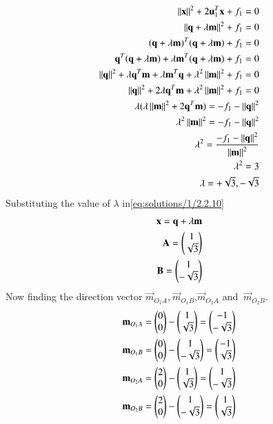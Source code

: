   \begin{align}
 \left\lVert\mathbf{x}\right\rVert^2 + 2\mathbf{u}_1^T\mathbf{x} + f_1 = 0\\
 \left\lVert\mathbf{q}+\lambda\mathbf{m}\right\rVert^2 + f_1 = 0\\
 (\mathbf{q}+\lambda \mathbf{m})^T(\mathbf{q}+\lambda \mathbf{m})+f_1=0\\
 \mathbf{q}^T(\mathbf{q}+\lambda \mathbf{m})+\lambda \mathbf{m}^T(\mathbf{q}+\lambda \mathbf{m})+f_1=0\\
 \left\lVert\mathbf{q}\right\rVert^2+\lambda\mathbf{q}^T\mathbf{m}+\lambda\mathbf{m}^T\mathbf{q}+\lambda^2\left\lVert\mathbf{m}\right\rVert^2+f_1=0\\
 \left\lVert\mathbf{q}\right\rVert^2+2\lambda\mathbf{q}^T\mathbf{m}+\lambda^2\left\lVert\mathbf{m}\right\rVert^2+f_1=0 \\
\lambda(\lambda\left\lVert\mathbf{m}\right\rVert^2+2\mathbf{q}^T\mathbf{m})=-f_1-\left\lVert\mathbf{q}\right\rVert^2\\
\lambda^2\left\lVert\mathbf{m}\right\rVert^2=-f_1-\left\lVert\mathbf{q}\right\rVert^2\\
\lambda^2=\frac{-f_1-\left\lVert\mathbf{q}\right\rVert^2}{\left\lVert\mathbf{m}\right\rVert^2}\\
\lambda^2=3\\
 \lambda=+\sqrt{3},-\sqrt{3}
 \end{align}
Substituting the value of $\lambda$ in\eqref{eq:solutions/1/2.2.10}
\begin{align}
\mathbf{x}=\mathbf{q}+\lambda\mathbf{m}\\
\mathbf{A}=\begin{pmatrix}1\\\sqrt{3}\end{pmatrix}\\
\mathbf{B}=\begin{pmatrix}1\\-\sqrt{3}\end{pmatrix}
 \end{align} 
 Now finding the direction vector $ \vec{m}_{O_1A}$,$\ \vec{m}_{O_1B}$,$ \vec{m}_{O_2A}$ and $\ \vec{m}_{O_2B}$.
\begin{align}
\mathbf{m}_{O_1A}=\begin{pmatrix}0\\0\end{pmatrix}-\begin{pmatrix}1\\\sqrt{3}\end{pmatrix}=\begin{pmatrix}-1\\-\sqrt{3}\end{pmatrix}\\
\mathbf{m}_{O_1B}=\begin{pmatrix}0\\0\end{pmatrix}-\begin{pmatrix}1\\-\sqrt{3}\end{pmatrix}=\begin{pmatrix}-1\\\sqrt{3}\end{pmatrix}\\
\mathbf{m}_{O_2A}=\begin{pmatrix}2\\0\end{pmatrix}-\begin{pmatrix}1\\\sqrt{3}\end{pmatrix}=\begin{pmatrix}1\\-\sqrt{3}\end{pmatrix}\\
\mathbf{m}_{O_2B}=\begin{pmatrix}2\\0\end{pmatrix}-\begin{pmatrix}1\\-\sqrt{3}\end{pmatrix}=\begin{pmatrix}1\\\sqrt{3}\end{pmatrix}
\end{align}
